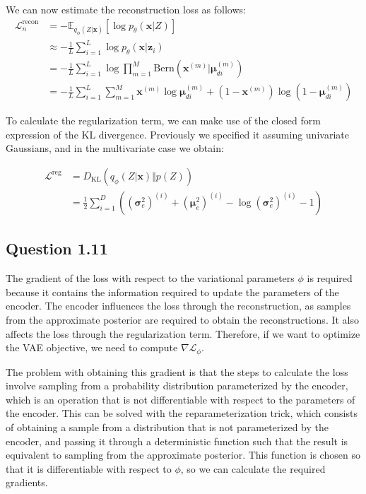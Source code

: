 \documentclass{article}
\begin{document}
We can now estimate the reconstruction loss as follows:
\begin{align*}
\mathcal{L}_n^{\text{recon}} &= -\mathbb{E}_{q_\phi(Z\vert\mathbf{x})}[\log p_\theta(\mathbf{x}\vert Z)] \\
&\approx -\frac{1}{L}\sum_{i=1}^L \log p_\theta(\mathbf{x}\vert \mathbf{z}_i) \\
&=
-\frac{1}{L}\sum_{i=1}^L\log \prod_{m=1}^M \text{Bern}(\mathbf{x}^{(m)}\vert \boldsymbol{\mu}_{di}^{(m)}) \\
&=
-\frac{1}{L}\sum_{i=1}^L\sum_{m=1}^M \mathbf{x}^{(m)}\log\boldsymbol{\mu}_{di}^{(m)} + (1-\mathbf{x}^{(m)})\log(1 -\boldsymbol{\mu}_{di}^{(m)})
\end{align*}

To calculate the regularization term, we can make use of the closed form expression of the KL divergence. Previously we specified it assuming univariate Gaussians, and in the multivariate case we obtain:

\begin{align*}
\mathcal{L}^{\text{reg}} &= \mathcal{} D_\text{KL}(q_\phi(Z\vert\mathbf{x})\Vert p(Z)) \\
&=
\frac{1}{2}\sum_{i=1}^D ((\boldsymbol{\sigma}_e^2)^{(i)} + (\boldsymbol{\mu}_e^2)^{(i)} - \log(\boldsymbol{\sigma}_e^2)^{(i)} - 1)
\end{align*}

\subsection*{Question 1.11}

The gradient of the loss with respect to the variational parameters $\phi$ is required because it contains the information required to update the parameters of the encoder. The encoder influences the loss through the reconstruction, as samples from the approximate posterior are required to obtain the reconstructions. It also affects the loss through the regularization term. Therefore, if we want to optimize the VAE objective, we need to compute $\nabla\mathcal{L}_\phi$.

The problem with obtaining this gradient is that the steps to calculate the loss involve sampling from a probability distribution parameterized by the encoder, which is an operation that is not differentiable with respect to the parameters of the encoder. This can be solved with the reparameterization trick, which consists of obtaining a sample from a distribution that is not parameterized by the encoder, and passing it through a deterministic function such that the result is equivalent to sampling from the approximate posterior. This function is chosen so that it is differentiable with respect to $\phi$, so we can calculate the required gradients.
\end{document}
